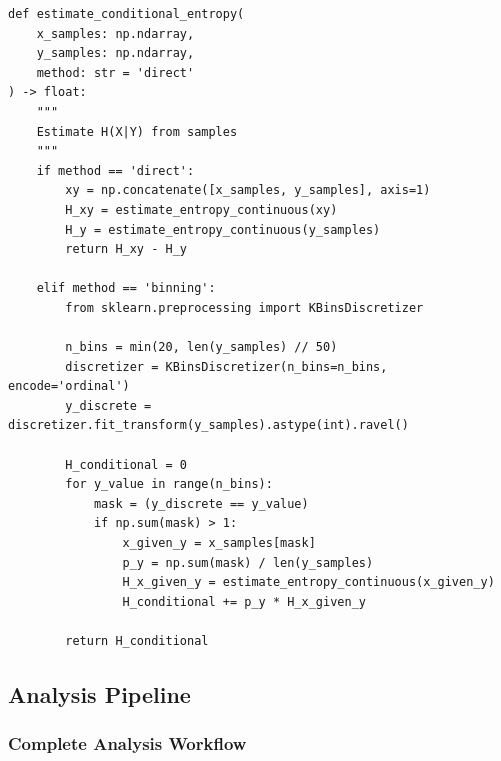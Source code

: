 \documentclass[10pt, letterpaper]{article}
\begin{document}
\begin{lstlisting}
def estimate_conditional_entropy(
    x_samples: np.ndarray,
    y_samples: np.ndarray,
    method: str = 'direct'
) -> float:
    """
    Estimate H(X|Y) from samples
    """
    if method == 'direct':
        xy = np.concatenate([x_samples, y_samples], axis=1)
        H_xy = estimate_entropy_continuous(xy)
        H_y = estimate_entropy_continuous(y_samples)
        return H_xy - H_y

    elif method == 'binning':
        from sklearn.preprocessing import KBinsDiscretizer

        n_bins = min(20, len(y_samples) // 50)
        discretizer = KBinsDiscretizer(n_bins=n_bins, encode='ordinal')
        y_discrete = discretizer.fit_transform(y_samples).astype(int).ravel()

        H_conditional = 0
        for y_value in range(n_bins):
            mask = (y_discrete == y_value)
            if np.sum(mask) > 1:
                x_given_y = x_samples[mask]
                p_y = np.sum(mask) / len(y_samples)
                H_x_given_y = estimate_entropy_continuous(x_given_y)
                H_conditional += p_y * H_x_given_y

        return H_conditional
\end{lstlisting}

\subsection{Analysis Pipeline}

\subsubsection{Complete Analysis Workflow}
\end{document}
